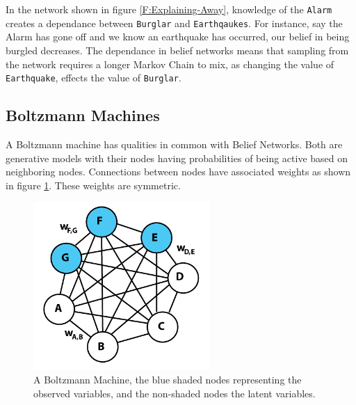     In the network shown in figure \ref{F:Explaining-Away}, knowledge of the \texttt{Alarm} creates a dependance between \texttt{Burglar} and \texttt{Earthqaukes}. For instance, say the Alarm has gone off and we know an earthquake has occurred, our belief in being burgled decreases. The dependance in belief networks means that sampling from the network requires a longer Markov Chain to mix, as changing the value of \texttt{Earthquake}, effects the value of \texttt{Burglar}. 

  \subsection{Boltzmann Machines}

  A Boltzmann machine   has qualities in common with Belief Networks. Both are generative models with their nodes having probabilities of being active based on neighboring nodes. Connections between nodes have associated weights as shown in figure \ref{F:Boltzmann-Machine}. These weights are symmetric.


  \begin{figure}[h]
  \begin{center}
    \includegraphics[width = 0.6\textwidth]{Assets/Boltzmann_Machine.png}
  \caption{A Boltzmann Machine, the blue shaded nodes representing the observed variables, and the non-shaded nodes the latent variables.}
  \label{F:Boltzmann-Machine}
  \end{center}
  \end{figure}


